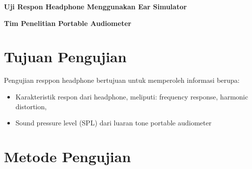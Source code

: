 \documentclass{article}
\begin{document}
	\begin{titlepage}
		\centering
		
		{
			\LARGE
			\bf
			Uji Respon Headphone Menggunakan Ear Simulator
		}
		
		\bigskip
		
		{
			\large
			\bf
			Tim Penelitian Portable Audiometer  
		}
		
		\vfill
	\end{titlepage}
	
	\newpage
	
	
	\section{Tujuan Pengujian}
	Pengujian resppon headphone bertujuan untuk memperoleh informasi berupa:
	\begin{itemize}
		\item Karakteristik respon dari headphone, meliputi: frequency response, harmonic distortion, 
		\item Sound pressure level (SPL) dari luaran tone portable audiometer
	\end{itemize}
	
	\section{Metode Pengujian}
\end{document}

